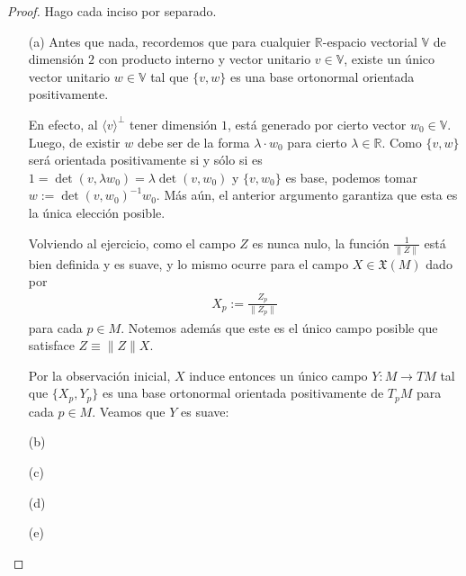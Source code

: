 \documentclass[11pt]{article}
\newcommand{\R}{\mathbb{R}}
\newcommand{\X}{\mathfrak{X}}
\newcommand{\ip}[1]{\langle #1 \rangle}
\begin{document}
\begin{proof} Hago cada inciso por separado.
\begin{itemize}[listparindent = \parindent]
\item[(a)] Antes que nada, recordemos que para cualquier $\R$-espacio vectorial $\mathbb{V}$ de dimensión $2$ con producto interno y vector unitario $v \in \mathbb{V}$, existe un único vector unitario $w \in \mathbb{V}$ tal que $\{v,w\}$ es una base ortonormal orientada positivamente. 

En efecto, al $\ip{v}^\perp$ tener dimensión $1$, está generado por cierto vector $w_0 \in \mathbb{V}$. Luego, de existir $w$ debe ser de la forma $\lambda \cdot w_0$ para cierto $\lambda \in \R$. Como $\{v,w\}$ será orientada positivamente si y sólo si es $1 = \det(v,\lambda w_0)= \lambda \det(v,w_0)$ y $\{v,w_0\}$ es base, podemos tomar $w := \det(v,w_0)^{-1}w_0$. Más aún, el anterior argumento garantiza que esta es la única elección posible.

Volviendo al ejercicio, como el campo $Z$ es nunca nulo, la función $\frac{1}{\|Z\|}$ está bien definida y es suave, y lo mismo ocurre para el campo $X \in \X(M)$ dado por
\begin{align*}
X_p := \frac{Z_p}{\|Z_p\|}
\end{align*}
para cada $p \in M$. Notemos además que este es el único campo posible que satisface $Z \equiv \|Z\|X$. 

Por la observación inicial, $X$ induce entonces un único campo $Y : M \to TM$ tal que $\{X_p,Y_p\}$ es una base ortonormal orientada positivamente de $T_pM$ para cada $p \in M$. Veamos que $Y$ es suave: 
\item[(b)]
\item[(c)]
\item[(d)]
\item[(e)]
\end{itemize}
\end{proof}
\end{document}
